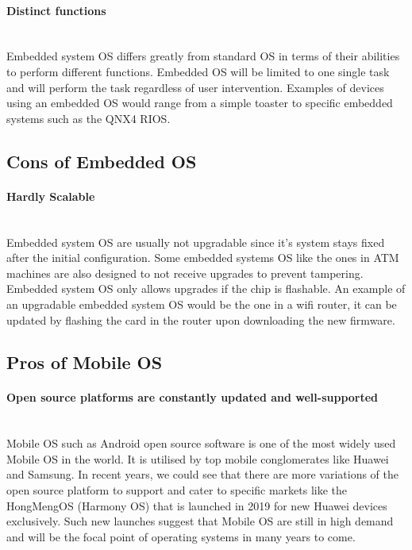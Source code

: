 \documentclass[conference]{IEEEtran}
\newcommand{\forceindent}{\leavevmode{\parindent=1em\indent}}
\begin{document}
\medskip
\paragraph{Distinct functions} \mbox{} \\
\forceindent Embedded system OS differs greatly from standard OS in terms of their abilities to perform different functions. Embedded OS will be limited to one single task and will perform the task regardless of user intervention. Examples of devices using an embedded OS would range from a simple toaster to specific embedded systems such as the QNX4 RIOS\cite{NOSvsEOS}.

\medskip
\subsection{Cons of Embedded OS}
\paragraph{Hardly Scalable} \mbox{} \\
\forceindent Embedded system OS are usually not upgradable since it's system stays fixed after the initial configuration. Some embedded systems OS like the ones in  ATM machines are also designed to not receive upgrades to prevent tampering. Embedded system OS only allows upgrades if the chip is flashable. An example of an upgradable embedded system OS would be the one in a wifi router, it can be updated by flashing the card in the router upon downloading the new firmware\cite{lifewire}.

\medskip
\subsection{Pros of Mobile OS}
\paragraph{Open source platforms are constantly updated and well-supported} \mbox{} \\
\forceindent Mobile OS such as Android open source software is one of the most widely used Mobile OS in the world. It is utilised by top mobile conglomerates like Huawei and Samsung. In recent years, we could see that there are more variations of the open source platform to support and cater to specific markets like the HongMengOS (Harmony OS) that is launched in 2019 for new Huawei devices exclusively\cite{HuaweiHongmeng}. Such new launches suggest that Mobile OS are still in high demand and will be the focal point of operating systems in many years to come.
\end{document}

